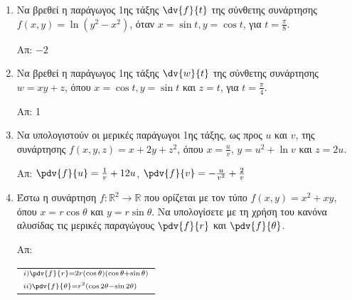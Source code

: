 




\pagestyle{vangelis}
\everymath{\displaystyle}



\begin{center}
\end{center}

\vspace{\baselineskip}

\begin{enumerate}




  \section{Απλες}

  \item Να βρεθεί η παράγωγος 1ης τάξης $\dv{f}{t}$ της σύνθετης συνάρτησης $f(x,y)=\ln(y^2-x^2)$, όταν $x=\sin t, y=\cos t$, για $t=\frac{\pi}{8}$.

    \hfill Απ: $\scriptstyle{-2}$

  \item Να βρεθεί η παράγωγος 1ης τάξης $\dv{w}{t}$ της σύνθετης συνάρτησης $ w = xy+z $, όπου $ x =
    \cos{t}, y = \sin{t}$ και $ z = t $, για $ t = \frac{ \pi }{ 4 } $.

    \hfill Απ: 1

  \item Να υπολογιστούν οι μερικές παράγωγοι 1ης τάξης, ως προς $u$ και $v$, της συνάρτησης $ f(x,y,z)
    = x + 2y + z^{2}$, όπου $ x = \frac{ u }{ v } $, $y = u^{2} + \ln{v} $ και $ z = 2u $.

    \hfill Απ: $ \pdv{f}{u} = \frac{1}{ v } + 12u $, $\pdv{f}{v} = -\frac{ u }{ v^{2} } + \frac{
    2 }{ v } $

  \item Έστω η συνάρτηση $ f : \mathbb{R}^{2} \to \mathbb{R} $ που ορίζεται με τον τύπο $ f(x,y) =
    x^{2} + xy $, όπου $ x=r \cos{\theta} $ και $ y= r \sin{\theta} $. Να υπολογίσετε με τη χρήση
    του κανόνα αλυσίδας τις μερικές παραγώγους $ \pdv{f}{r} $ και $ \pdv{f}{\theta} $.

    \hfill Απ: \begin{tabular}{l}
      $\scriptstyle{i) \pdv{f}{r} = 2r(\cos{\theta} )(\cos{\theta} + \sin{\theta})}
      $ \\
      $\scriptstyle{ii) \pdv{f}{\theta}=r^{2}(\cos{2\theta} - \sin{2 \theta})} $
    \end{tabular}



\end{enumerate}
